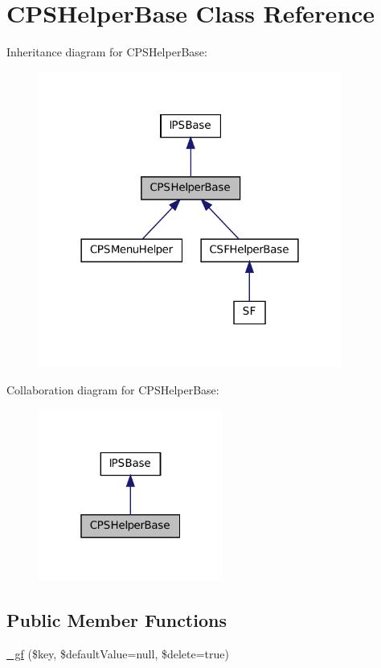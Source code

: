 \hypertarget{classCPSHelperBase}{
\section{CPSHelperBase Class Reference}
\label{classCPSHelperBase}
}


Inheritance diagram for CPSHelperBase:\nopagebreak
\begin{figure}[H]
\begin{center}
\leavevmode
\includegraphics[width=282pt]{classCPSHelperBase__inherit__graph}
\end{center}
\end{figure}


Collaboration diagram for CPSHelperBase:\nopagebreak
\begin{figure}[H]
\begin{center}
\leavevmode
\includegraphics[width=172pt]{classCPSHelperBase__coll__graph}
\end{center}
\end{figure}
\subsection*{Public Member Functions}
\begin{DoxyCompactItemize}
\item 
\hyperlink{classCPSHelperBase_a1f5b11e66cea38099ad43bd1c41b6dc6}{\_\-gf} (\$key, \$defaultValue=null, \$delete=true)
\end{DoxyCompactItemize}
